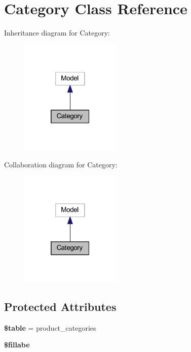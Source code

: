 \hypertarget{class_app_1_1_models_1_1_product_1_1_category}{}\section{Category Class Reference}
\label{class_app_1_1_models_1_1_product_1_1_category}


Inheritance diagram for Category\+:
\nopagebreak
\begin{figure}[H]
\begin{center}
\leavevmode
\includegraphics[width=136pt]{class_app_1_1_models_1_1_product_1_1_category__inherit__graph}
\end{center}
\end{figure}


Collaboration diagram for Category\+:
\nopagebreak
\begin{figure}[H]
\begin{center}
\leavevmode
\includegraphics[width=136pt]{class_app_1_1_models_1_1_product_1_1_category__coll__graph}
\end{center}
\end{figure}
\subsection*{Protected Attributes}
\begin{DoxyCompactItemize}
\item 
\mbox{\label{class_app_1_1_models_1_1_product_1_1_category_ae8876a14058f368335baccf35af4a22b}} 
{\bfseries \$table} = \textquotesingle{}product\+\_\+categories\textquotesingle{}
\item 
{\bfseries \$fillabe}
\end{DoxyCompactItemize}


